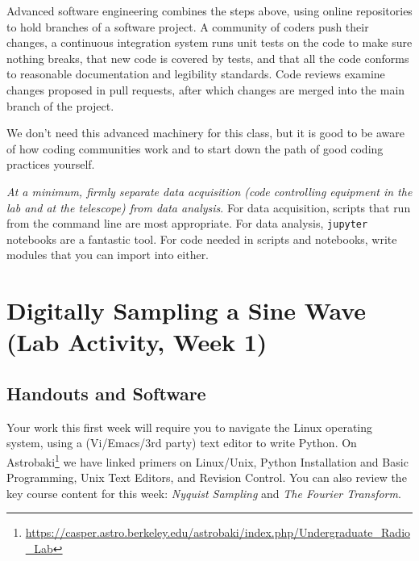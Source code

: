 \documentclass[11pt,preprint]{aastex}
\begin{document}
\noindent
Advanced software engineering combines the steps above, 
using online repositories to hold 
branches of a software project. A community of coders push their changes, 
a continuous integration system runs unit tests on the code to make sure 
nothing breaks, that new code is covered by tests, and
that all the code conforms to reasonable documentation and 
legibility standards.  Code reviews examine changes 
proposed in pull requests, after which changes are merged into the 
main branch of the project.

We don't need this advanced machinery for this class, but it is good 
to be aware of how coding communities work and
to start down the path of good coding practices yourself.

{\it At a minimum, firmly separate data acquisition (code
controlling equipment in the lab and at the telescope) 
from data analysis}.  For data acquisition, scripts that run from the 
command line are most appropriate. For data analysis, {\tt jupyter}
notebooks are a fantastic tool. For code needed in scripts and notebooks,
write modules that you can import into either.


\section{Digitally Sampling a Sine Wave (Lab Activity, Week 1)}
\label{nyquist}

\subsection{Handouts and Software}

\noindent
Your work this first week will require you to navigate
the Linux operating system, using a (Vi/Emacs/3rd party) text editor to write Python. 
On Astrobaki\footnote{\url{https://casper.astro.berkeley.edu/astrobaki/index.php/Undergraduate_Radio_Lab}}
we have linked primers on
Linux/Unix, Python Installation and Basic Programming, Unix Text Editors, and Revision Control.  You can
also review the key course content for this week: {\it Nyquist Sampling}
 and {\it The Fourier Transform}.
\end{document}
